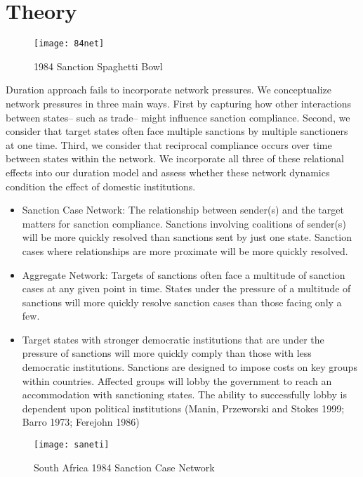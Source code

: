 \section{Theory}
\label{theory}

\begin{figure}[ht]
  \centering
  \texttt{[image: 84net]}
  \caption{1984 Sanction Spaghetti Bowl}
\end{figure}

Duration approach fails to incorporate network pressures. We conceptualize network pressures in three main ways. First by capturing how other interactions between states-- such as trade-- might influence sanction compliance. Second, we consider that target states often face multiple sanctions by multiple sanctioners at one time. Third, we consider that reciprocal compliance occurs over time between states within the network. We incorporate all three of these relational effects into our duration model and assess whether these network dynamics condition the effect of domestic institutions. 

\begin{itemize}
\item Sanction Case Network: The relationship between sender(s) and the target matters for sanction compliance. Sanctions involving coalitions of sender(s) will be more quickly resolved than sanctions sent by just one state. Sanction cases where relationships are more proximate will be more quickly resolved.
\item Aggregate Network: Targets of sanctions often face a multitude of sanction cases at any given point in time. States under the pressure of a multitude of sanctions will more quickly resolve sanction cases than those facing only a few.
\item Target states with stronger democratic institutions that are under the pressure of sanctions will more quickly comply than those with less democratic institutions. Sanctions are designed to impose costs on key groups within countries. Affected groups will lobby the government to reach an accommodation with sanctioning states. The ability to successfully lobby is dependent upon political institutions (Manin, Przeworski and Stokes 1999; Barro 1973; Ferejohn 1986)
\end{itemize}

\begin{figure}[ht]
	\centering
	\texttt{[image: saneti]}
	\caption{South Africa 1984 Sanction Case Network}
\end{figure}

